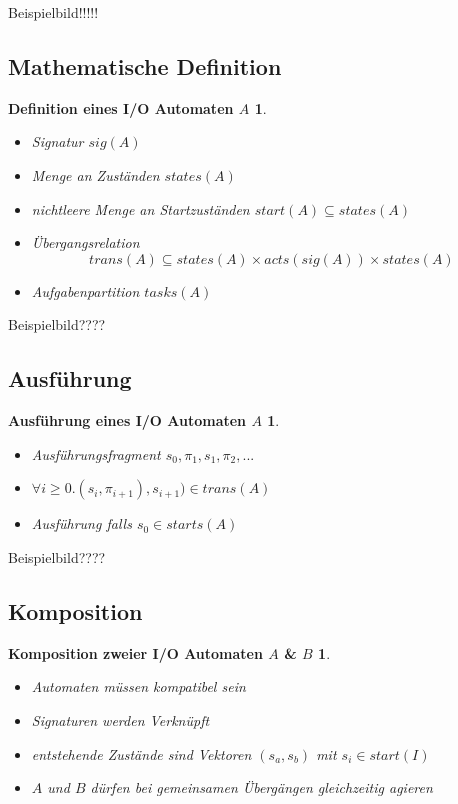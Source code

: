 \documentclass[10pt]{beamer}
\newtheorem{iodefinition}{Definition eines I/O Automaten $A$}
\newtheorem{execdefinition}{Ausführung eines I/O Automaten $A$}
\newtheorem{pardefinition}{Komposition zweier I/O Automaten $A$ \& $B$}
\begin{document}
	Beispielbild!!!!!
	
	\newpage
	\subsection{Mathematische Definition}
	\begin{iodefinition}
		\begin{itemize}
			\item Signatur $sig(A)$	
			\item Menge an Zuständen $states(A)$
			\item nichtleere Menge an Startzuständen $start(A) \subseteq states(A)$
			\item Übergangsrelation
			\[
			trans(A) \subseteq states(A) \times acts(sig(A)) \times states(A)
			\]
			\item Aufgabenpartition $tasks(A)$
		\end{itemize}
	\end{iodefinition}
	
	Beispielbild????
	
	\newpage
	\subsection{Ausführung}
	\begin{execdefinition}
		\begin{itemize}
			\item Ausführungsfragment $s_0, \pi_1, s_1, \pi_2,...$
			\item $\forall i \geq 0. (s_i, \pi_{i+1}), s_{i+1}) \in trans(A)$
			\item Ausführung falls $s_0 \in starts(A)$
		\end{itemize}
	\end{execdefinition}
	
	Beispielbild????
	
	\newpage
	\subsection{Komposition}
	\begin{pardefinition}
		\begin{itemize}
			\item Automaten müssen kompatibel sein
			\item Signaturen werden Verknüpft  
			\item entstehende Zustände sind Vektoren $(s_a, s_b)$ mit $s_i \in start(I)$
			\item $A$ und $B$ dürfen bei gemeinsamen Übergängen gleichzeitig agieren
		\end{itemize}
	\end{pardefinition}
	
\end{document}
